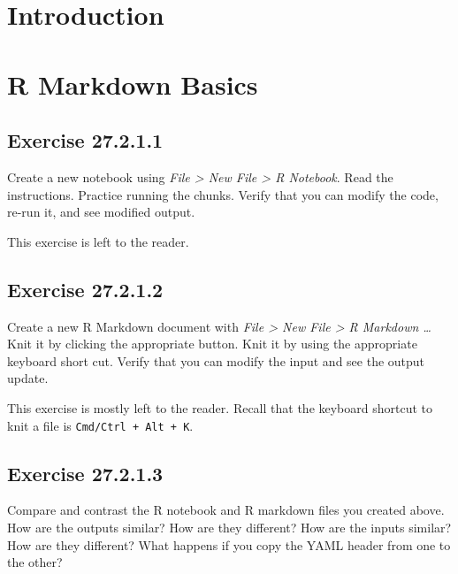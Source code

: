 \documentclass[]{book}
\theoremstyle{plain}
\theoremstyle{remark}
\begin{document}
\hypertarget{introduction-17}{%
\section{Introduction}\label{introduction-17}}

\hypertarget{r-markdown-basics}{%
\section{R Markdown Basics}\label{r-markdown-basics}}

\hypertarget{exercise-27.2.1.1}{%
\subsection*{\texorpdfstring{Exercise
{27.2.1.1}}{Exercise 27.2.1.1}}\label{exercise-27.2.1.1}}

Create a new notebook using \emph{File \textgreater{} New File
\textgreater{} R Notebook}. Read the instructions. Practice running the
chunks. Verify that you can modify the code, re-run it, and see modified
output.

This exercise is left to the reader.

\hypertarget{exercise-27.2.1.2}{%
\subsection*{\texorpdfstring{Exercise
{27.2.1.2}}{Exercise 27.2.1.2}}\label{exercise-27.2.1.2}}

Create a new R Markdown document with \emph{File \textgreater{} New File
\textgreater{} R Markdown \ldots{}} Knit it by clicking the appropriate
button. Knit it by using the appropriate keyboard short cut. Verify that
you can modify the input and see the output update.

This exercise is mostly left to the reader. Recall that the keyboard
shortcut to knit a file is \texttt{Cmd/Ctrl\ +\ Alt\ +\ K}.

\hypertarget{exercise-27.2.1.3}{%
\subsection*{\texorpdfstring{Exercise
{27.2.1.3}}{Exercise 27.2.1.3}}\label{exercise-27.2.1.3}}

Compare and contrast the R notebook and R markdown files you created
above. How are the outputs similar? How are they different? How are the
inputs similar? How are they different? What happens if you copy the
YAML header from one to the other?
\end{document}
